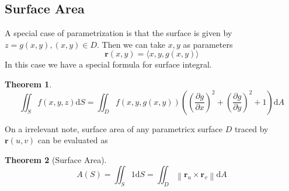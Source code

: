 \documentclass[12pt]{article}
\newcommand\norm[1]{\left\lVert#1\right\rVert}
\newtheorem{theorem}{Theorem}[section]
\theoremstyle{definition}
\newcommand{\diff}{\mathrm{d}}
\begin{document}
\subsection{Surface Area}
A special case of parametrization is that the surface is given by $z=g(x,y), (x,y)\in D$. Then we can take $x,y$ as parameters
\[
\mathbf{r}(x,y) = \langle x,y,g(x,y)\rangle
\]
In this case we have a special formula for surface integral.
\begin{theorem}
\hfill\\\normalfont 
\[
\iint_Sf(x,y,z)\diff S = \iint_Df(x,y,g(x,y))\left(\left(\frac{\partial g}{\partial x}\right)^2+\left(\frac{\partial g}{\partial y}\right)^2+1\right)\diff A
\]
\end{theorem}
On a irrelevant note, surface area of any parametricx surface $D$ traced by $\mathbf{r}(u,v)$ can be evaluated as
\begin{theorem}[Surface Area]\hfill\\\normalfont
\[
A(S)=\iint_S 1\diff S = \iint_D\norm{\mathbf{r}_u\times\mathbf{r}_v}\diff A
\]\end{theorem}
\end{document}
